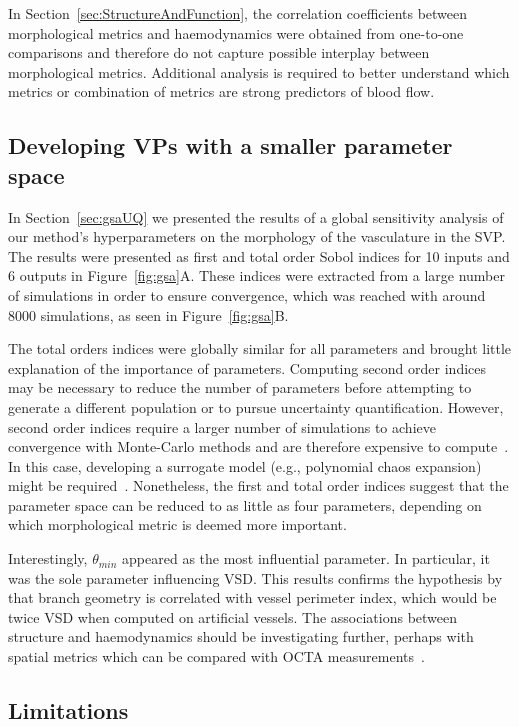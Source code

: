 \documentclass[11pt,]{article}
\begin{document}
In Section~\ref{sec:StructureAndFunction}, the correlation coefficients between morphological metrics and haemodynamics were obtained from one-to-one comparisons and therefore do not capture possible interplay between morphological metrics.
Additional analysis is required to better understand which metrics or combination of metrics are strong predictors of blood flow.

\subsection{Developing VPs with a smaller parameter space}\label{sec:disc-gsa}

In Section~\ref{sec:gsaUQ} we presented the results of a global sensitivity analysis of our method's hyperparameters on the morphology of the vasculature in the SVP.
The results were presented as first and total order Sobol indices for 10 inputs and 6 outputs in Figure~\ref{fig:gsa}A.
These indices were extracted from a large number of simulations in order to ensure convergence, which was reached with around \SI{8000}{} simulations, as seen in Figure~\ref{fig:gsa}B.

The total orders indices were globally similar for all parameters and brought little explanation of the importance of parameters.
Computing second order indices may be necessary to reduce the number of parameters before attempting to generate a different population or to pursue uncertainty quantification.
However, second order indices require a larger number of simulations to achieve convergence with Monte-Carlo methods and are therefore expensive to compute~\cite{Saltelli2008}.
In this case, developing a surrogate model (e.g., polynomial chaos expansion) might be required~\cite{Saltelli2008}.
Nonetheless, the first and total order indices suggest that the parameter space can be reduced to as little as four parameters, depending on which morphological metric is deemed more important.

Interestingly, $\theta_{min}$ appeared as the most influential parameter.
In particular, it was the sole parameter influencing VSD.
This results confirms the hypothesis by \cite{Yao_2020} that branch geometry is correlated with vessel perimeter index, which would be twice VSD when computed on artificial vessels.
The associations between structure and haemodynamics should be investigating further, perhaps with spatial metrics which can be compared with OCTA measurements~\cite{Yao_2020}.

\subsection{Limitations}\label{sec:disc-limitations}
\end{document}
